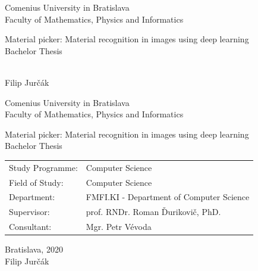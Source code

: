 \documentclass[12pt, twoside]{book}
\def\mfrok{2020}
\def\mfnazov{Material picker: Material recognition in images using deep learning}
\def\mftyp{Bachelor Thesis}
\def\mfautor{Filip Jurčák}
\def\mfskolitel{prof. RNDr. Roman Ďurikovič, PhD.}
\def\mfkonzultant{Mgr. Petr Vévoda}
\def\mfmiesto{Bratislava, \mfrok}
\def\mfodbor{Computer Science}
\def\program{Computer Science}
\def\mfpracovisko{ FMFI.KI - Department of Computer Science }
\begin{document}
     
\frontmatter


\thispagestyle{empty}

\begin{center}
  \sc\large
  Comenius University in Bratislava\\
  Faculty of Mathematics, Physics and Informatics

\vfill

{\LARGE\mfnazov}\\
\mftyp
\end{center}

\vfill

{\sc\large 
\noindent \mfrok\\
\mfautor
}

\cleardoublepage


\thispagestyle{empty}
\noindent

\begin{center}
\sc  
\large
  Comenius University in Bratislava\\
  Faculty of Mathematics, Physics and Informatics

\vfill

{\LARGE\mfnazov}\\
\mftyp
\end{center}

\vfill

\noindent
\begin{tabular}{ll}
Study Programme: & \program \\
Field of Study: & \mfodbor \\
Department: & \mfpracovisko \\
Supervisor: & \mfskolitel \\
Consultant: & \mfkonzultant \\
\end{tabular}

\vfill


\noindent \mfmiesto\\
\mfautor

\cleardoublepage


\end{document}
